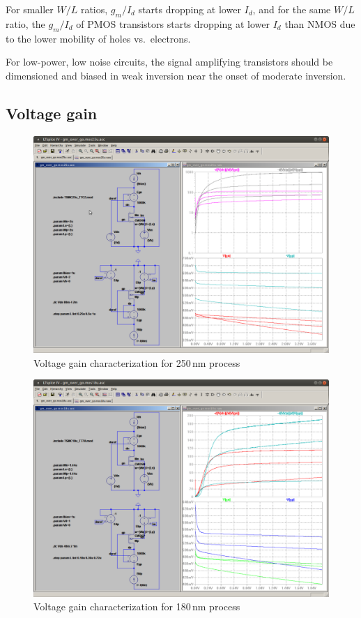 \documentclass[journal]{IEEEtran}
\begin{document}
For smaller $W/L$ ratios, $g_m/I_d$ starts dropping at lower $I_d$, 
and for the same $W/L$ ratio, the $g_m/I_d$ of PMOS transistors starts dropping at lower $I_d$ than NMOS due to the lower mobility of holes vs.\ electrons.

For low-power, low noise circuits, 
the signal amplifying transistors should be dimensioned and biased in weak inversion
near the onset of moderate inversion. 

\subsection{Voltage gain}
%
\begin{figure}[h]
\centering
\includegraphics[width=1.0\columnwidth]{figures/gm_over_go_mos25u.pdf}
\caption{Voltage gain characterization for 250\,nm process}
\label{fig:gm_go_mos25}
\end{figure}
%
\begin{figure}[h]
\centering
\includegraphics[width=1.0\columnwidth]{figures/gm_over_go_mos18u.pdf}
\caption{Voltage gain characterization for 180\,nm process}
\label{fig:gm_go_mos18}
\end{figure}
%
\end{document}
